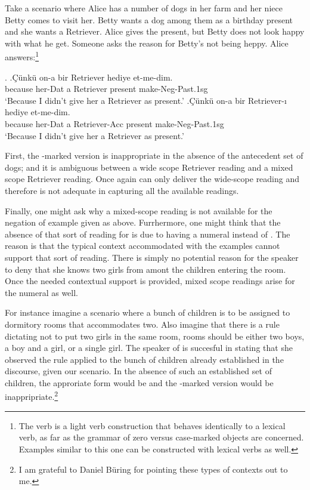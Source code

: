 \documentclass[11pt,a4paper]{article}
\begin{document}
Take a scenario where Alice has a number of dogs in her farm and her niece
Betty comes to visit her. Betty wants a dog among them as a birthday present
and she wants a Retriever. Alice gives the present, but Betty does not look
happy with what he get. Someone asks the reason for Betty's not being heppy.
Alice answers:\footnote{The verb  is a light verb
construction that behaves identically to a lexical verb, as far as the grammar
of zero versus case-marked objects are concerned. Examples similar to this one
can be constructed with lexical verbs as well.}

\ex.
\ag.\label{retz}Çünkü on-a bir Retriever hediye et-me-dim.\\
 because her-Dat a Retriever present make-Neg-Past.1sg\\
`Because I didn't give her a Retriever as present.'
\bg.\label{reta}Çünkü on-a bir Retriever-ı hediye et-me-dim.\\ 
because her-Dat a Retriever-Acc present make-Neg-Past.1sg\\
`Because I didn't give her a Retriever as present.'


First, the \acc-marked version  is inappropriate in the absence of
the antecedent set of dogs; and it is ambiguous between a wide scope Retriever
reading and a mixed scope Retriever reading. Once again 
can only deliver the wide-scope reading and therefore is not adequate in
capturing all the available readings.  

Finally, one might ask why a mixed-scope reading is not available for the
negation of  example given as  above.
Furrhermore, one might think that the absence of that sort of reading for
 is due to having a numeral  instead of
. The reason is that the typical context accommodated with the
examples cannot support that sort of reading. There is simply no potential
reason for the speaker to deny that she knows two girls from amont the children
entering the room. Once the needed contextual support is provided, mixed scope
readings arise for the numeral  as well.

For instance imagine a scenario where a bunch of children is to be assigned to
dormitory rooms that accommodates two. Also imagine that there is a rule
dictating not to put two girls in the same room, rooms should be either two
boys, a boy and a girl, or a single girl. The speaker of  is
succesful in stating that she observed the rule applied to the bunch of
children already established in the discourse, given our scenario. In the
absence of such an established set of children, the approriate form would be
 and the \acc-marked version  would be
inappripriate.\footnote{I am grateful to Daniel Büring for pointing these types
of contexts out to me.} 
\end{document}

